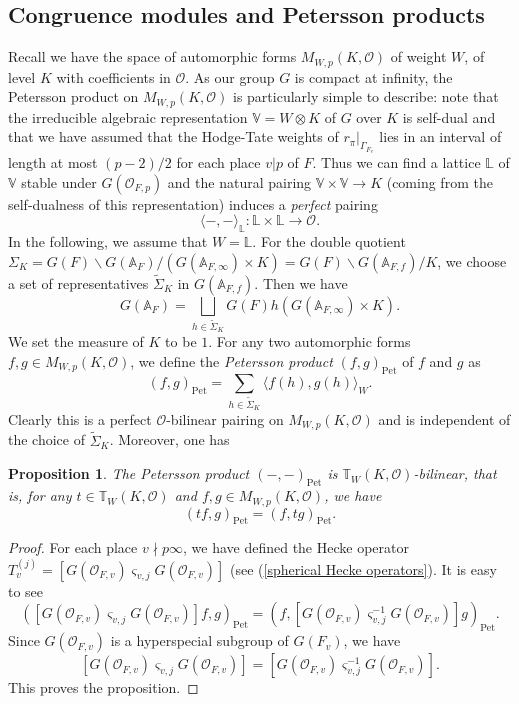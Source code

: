 \documentclass[12pt,oneside,reqno]{amsart}
\theoremstyle{plain}
\newtheorem{proposition}[theorem]{Proposition}
\begin{document}
	
	
	
	
	
	\subsection{Congruence modules and Petersson products}
	Recall we have the space of automorphic forms $M_{W,p}(K,\mathcal{O})$ of weight $W$, of level $K$ with coefficients in $\mathcal{O}$. As our group $G$ is compact at infinity, the Petersson product on $M_{W,p}(K,\mathcal{O})$ is particularly simple to describe:
	note that the irreducible algebraic representation $\mathbb{V}=W\otimes K$ of $G$ over $K$ is self-dual and that we have assumed that the Hodge-Tate weights of $r_\pi|_{\Gamma_{F_v}}$ lies in an interval of length at most $(p-2)/2$ for each place $v|p$ of $F$. Thus we can find a lattice $\mathbb{L}$ of $\mathbb{V}$ stable under $G(\mathcal{O}_{F,p})$ and the natural pairing $\mathbb{V}\times\mathbb{V}\to K$ (coming from the self-dualness of this representation) induces a \emph{perfect} pairing
	\[
	\langle-,-\rangle_\mathbb{L}
	\colon
	\mathbb{L}\times\mathbb{L}\to\mathcal{O}.
	\]
	In the following, we assume that $W=\mathbb{L}$. For the double quotient $\Sigma_K=G(F)\backslash G(\mathbb{A}_F)/(G(\mathbb{A}_{F,\infty})\times K)=G(F)\backslash G(\mathbb{A}_{F,f})/K$, we choose a set of representatives $\widetilde{\Sigma}_K$ in $G(\mathbb{A}_{F,f})$. Then we have
	\[
	G(\mathbb{A}_F)
	=
	\bigsqcup_{h\in\widetilde{\Sigma}_K}G(F)h(G(\mathbb{A}_{F,\infty})\times K).
	\]
	We set the measure of $K$ to be $1$.
	For any two automorphic forms $f,g\in M_{W,p}(K,\mathcal{O})$, we define the \emph{Petersson product} $(f,g)_\mathrm{Pet}$ of $f$ and $g$ as
	\[
	(f,g)_\mathrm{Pet}
	=
	\sum_{h\in\widetilde{\Sigma}_K}
	\langle f(h),g(h)\rangle_W.
	\]
	Clearly this is a perfect $\mathcal{O}$-bilinear pairing on $M_{W,p}(K,\mathcal{O})$ and is independent of the choice of $\widetilde{\Sigma}_K$.
	Moreover, one has
	\begin{proposition}\label{T-bilinearity of Petersson product}
		The Petersson product $(-,-)_\mathrm{Pet}$ is $\mathbb{T}_{W}(K,\mathcal{O})$-bilinear, that is, for any $t\in\mathbb{T}_W(K,\mathcal{O})$ and $f,g\in M_{W,p}(K,\mathcal{O})$, we have
		\[
		(tf,g)_\mathrm{Pet}=(f,tg)_\mathrm{Pet}.
		\]		
	\end{proposition}
	\begin{proof}
		For each place $v\nmid p\infty$, we have defined the Hecke operator $T_v^{(j)}=[G(\mathcal{O}_{F,v})\varsigma_{v,j}G(\mathcal{O}_{F,v})]$ (see (\ref{spherical Hecke operators}). It is easy to see
		\[
		([G(\mathcal{O}_{F,v})\varsigma_{v,j}G(\mathcal{O}_{F,v})]f,g)_\mathrm{Pet}
		=
		(f,[G(\mathcal{O}_{F,v})\varsigma_{v,j}^{-1}G(\mathcal{O}_{F,v})]g)_\mathrm{Pet}.
		\]
		Since $G(\mathcal{O}_{F,v})$ is a hyperspecial subgroup of $G(F_v)$, we have
		\[
		[G(\mathcal{O}_{F,v})\varsigma_{v,j}G(\mathcal{O}_{F,v})]
		=
		[G(\mathcal{O}_{F,v})\varsigma_{v,j}^{-1}G(\mathcal{O}_{F,v})].
		\]
		This proves the proposition.
	\end{proof}
	
\end{document}
